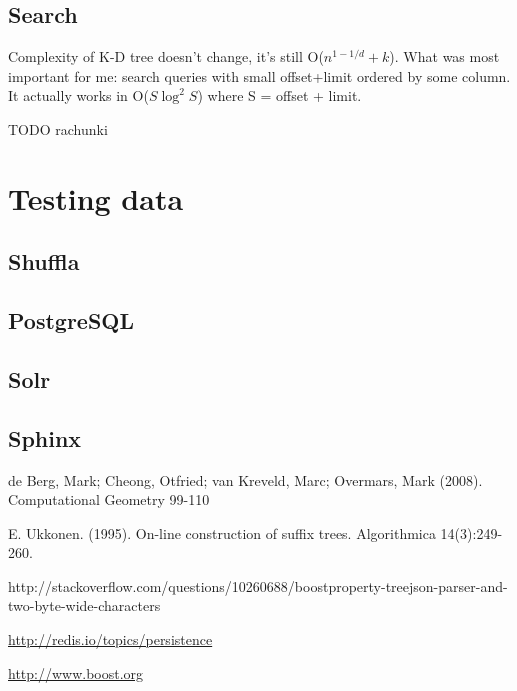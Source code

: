 \documentclass{llncs}
\newcommand{\<}{\langle}
\renewcommand{\>}{\rangle}
\begin{document}
\subsection{Search}
Complexity of K-D tree doesn't change, it's still O($n^{1-1/d} + k$). What was most important for me: search queries with small offset+limit ordered by some column. It actually works in O($S \log^2 S$) where S = offset + limit. 

TODO rachunki


\section{Testing data}
\subsection{Shuffla}
\subsection{PostgreSQL}
\subsection{Solr}
\subsection{Sphinx}



\begin{thebibliography}{99}

 de Berg, Mark; Cheong, Otfried; van Kreveld, Marc; Overmars, Mark (2008). Computational Geometry 99-110

 E. Ukkonen. (1995). On-line construction of suffix trees. Algorithmica 14(3):249-260.

 http://stackoverflow.com/questions/10260688/boostproperty-treejson-parser-and-two-byte-wide-characters

 \url{http://redis.io/topics/persistence}

 \url{http://www.boost.org}
\end{thebibliography}
\end{document}
